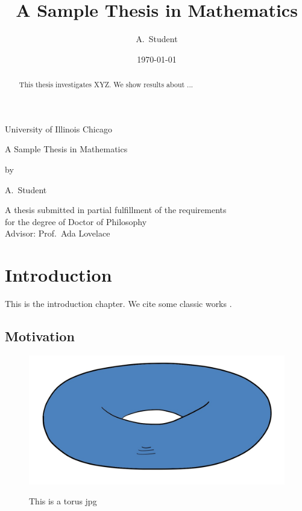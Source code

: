 \documentclass[12pt,reqno]{amsbook}
\theoremstyle{definition}
\begin{document}

\newcommand{\thetitle}{A Sample Thesis in Mathematics}
\title{\thetitle}
\date{\today}
\newcommand{\institution}{University of Illinois Chicago} 
\newcommand{\degree}{Doctor of Philosophy}
\newcommand{\advisor}{Prof.~Ada Lovelace}
\newcommand{\theauthor}{A.~Student}
\author{\theauthor}

\frontmatter

\begin{titlepage}
    \centering
    {\Large \institution\par}
    \vspace{2cm}
    {\Large \thetitle \par}
    \vspace{2cm}
    {\Large by\par}
    \vspace{0.5cm}
    {\Large \theauthor\par}
    \vfill
    A thesis submitted in partial fulfillment of the requirements \\
    for the degree of  \degree \\
    \vspace{0.5cm}
    Advisor: \advisor \\
    \vspace{1cm}
    \makeatletter\@date \makeatother
\end{titlepage}

\begin{abstract}
This thesis investigates XYZ. We show results about ...
\end{abstract}

\tableofcontents

\mainmatter

\chapter{Introduction}
This is the introduction chapter. We cite some classic works \cite{einstein,serre}.

\section{Motivation}
\begin{figure}\label{fig1}
\includegraphics[alt="Description of Image that serves the same purpose",scale=0.3]{torus.jpg}
\caption{This is a torus jpg}
\end{figure}
\end{document}
